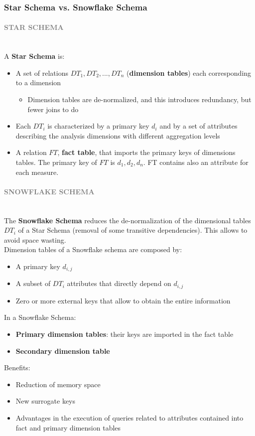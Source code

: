 \documentclass[10pt,a4paper]{article}
\newcommand{\myparagraph}[1]{\paragraph{\normalsize{\textcolor{gray}{\uppercase{\textbf{#1}}}} }\mbox{} \vspace{0.5em}\\}
\begin{document}
\begin{justify}
\subsubsection{Star Schema vs. Snowflake Schema}
\myparagraph{STAR SCHEMA}
A \textbf{Star Schema} is:
\begin{itemize}
	\item A set of relations $DT_1, DT_2,..., DT_n$ (\textbf{dimension tables}) each corresponding to a dimension
	\begin{itemize}
		\item Dimension tables are de-normalized, and this introduces redundancy, but fewer joins to do
	\end{itemize}
	\item Each $DT_i$ is characterized by a primary key $d_i$ and by a set of attributes describing the analysis dimensions with different aggregation levels
	\item A relation $FT$, \textbf{fact table}, that imports the primary keys of dimensions tables. The primary key of $FT$ is $d_1,d_2,d_n$. FT contains also an attribute for each measure.
\end{itemize}
\myparagraph{SNOWFLAKE SCHEMA}
The \textbf{Snowflake Schema} reduces the de-normalization of the dimensional tables $DT_i$ of a Star Schema (removal of some transitive dependencies). This allows to avoid space wasting. \\
Dimension tables of a Snowflake schema are composed by:
\begin{itemize}
	\item A primary key $d_{i,j}$
	\item A subset of $DT_i$ attributes that directly depend on $d_{i,j}$
	\item Zero or more external keys that allow to obtain the entire information
\end{itemize}
In a Snowflake Schema:
\begin{itemize}
	\item \textbf{Primary dimension tables}: their keys are imported in the fact table
	\item \textbf{Secondary dimension table}
\end{itemize}
Benefits:
\begin{itemize}
	\item Reduction of memory space
	\item New surrogate keys
	\item Advantages in the execution of queries related to attributes contained into fact and primary dimension tables

\end{itemize}
\end{justify}
\end{document}
